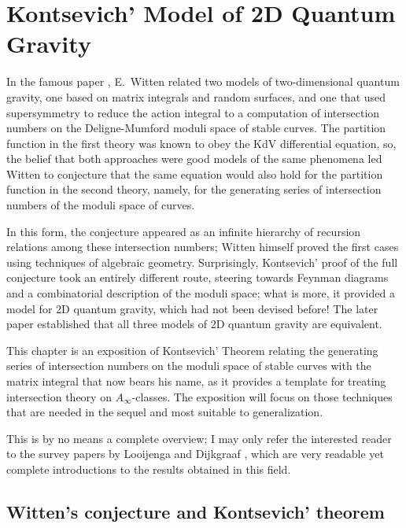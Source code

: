 

\chapter{Kontsevich' Model of 2D Quantum Gravity}
\label{cha:kontsevich}


In the famous paper \cite{witten;intersection-theory}, E.~Witten
related two models of two-dimensional quantum gravity, one based on
matrix integrals and random surfaces, and one that used supersymmetry
to reduce the action integral to a computation of intersection numbers
on the Deligne-Mumford moduli space of stable curves. The partition
function in the first theory was known to obey the KdV differential
equation, so, the belief that both approaches were good models of the
same phenomena led Witten to conjecture that the same equation would
also hold for the partition function in the second theory, namely, for
the generating series of intersection numbers of the moduli space of
curves.

In this form, the conjecture appeared as an infinite hierarchy of
recursion relations among these intersection numbers; Witten himself
proved the first cases using techniques of algebraic geometry.
Surprisingly, Kontsevich' proof of the full conjecture took an
entirely different route, steering towards Feynman diagrams and a
combinatorial description of the moduli space; what is more, it
provided a model for 2D quantum gravity, which had not been devised
before!  The later paper \cite{witten;kontsevich-model} established
that all three models of 2D quantum gravity are equivalent.

This chapter is an exposition of Kontsevich' Theorem \cite[Theorem
1.1]{kontsevich;intersection-theory;1992} relating the generating
series of intersection numbers on the moduli space of stable curves
with the matrix integral that now bears his name, as it provides a
template for treating intersection theory on $A_\infty$-classes.  The
exposition will focus on those techniques that are needed in the
sequel and most suitable to generalization.

This is by no means a complete overview; I may only refer the
interested reader to the survey papers by Looijenga
\cite{looijenga;intersection-theory} and Dijkgraaf
\cite{dijkgraaf;intersection-theory}, which are very readable yet
complete introductions to the results obtained in this field.


\section{Witten's conjecture and Kontsevich' theorem}
\label{sec:witten-classes}

